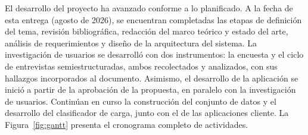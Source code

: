 
El desarrollo del proyecto ha avanzado conforme a lo planificado. {\color{nuevo}A la fecha de esta entrega (agosto de 2026), se encuentran completadas las etapas de definición del tema, revisión bibliográfica, redacción del marco teórico y estado del arte, análisis de requerimientos y diseño de la arquitectura del sistema. La investigación de usuarios se desarrolló con dos instrumentos: la encuesta y el ciclo de entrevistas semiestructuradas, ambos recolectados y analizados, con sus hallazgos incorporados al documento. Asimismo, el desarrollo de la aplicación se inició a partir de la aprobación de la propuesta, en paralelo con la investigación de usuarios. Continúan en curso la construcción del conjunto de datos y el desarrollo del clasificador de carga, junto con el de las aplicaciones cliente.} La Figura~\ref{fig:gantt} presenta el cronograma completo de actividades.

